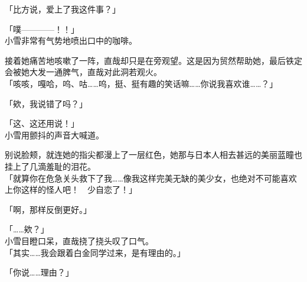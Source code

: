 「比方说，爱上了我这件事？」

 「噗————！！」\\

小雪非常有气势地喷出口中的咖啡。

接着她痛苦地咳嗽了一阵，直哉却只是在旁观望。这是因为贸然帮助她，最后铁定会被她大发一通脾气，直哉对此洞若观火。\\

「咳咳，嘎哈，呜、咕……呜，挺、挺有趣的笑话嘛……你说我喜欢谁……？」

「欸，我说错了吗？」

「这、这还用说！」\\

小雪用颤抖的声音大喊道。

别说脸颊，就连她的指尖都漫上了一层红色，她那与日本人相去甚远的美丽蓝瞳也挂上了几滴羞耻的泪花。\\

「就算你在危急关头救下了我……像我这样完美无缺的美少女，也绝对不可能喜欢上你这样的怪人吧！　少自恋了！」

「啊，那样反倒更好。」

「……欸？」\\

小雪目瞪口呆，直哉挠了挠头叹了口气。\\

「其实……我会跟着白金同学过来，是有理由的。」

「你说……理由？」

